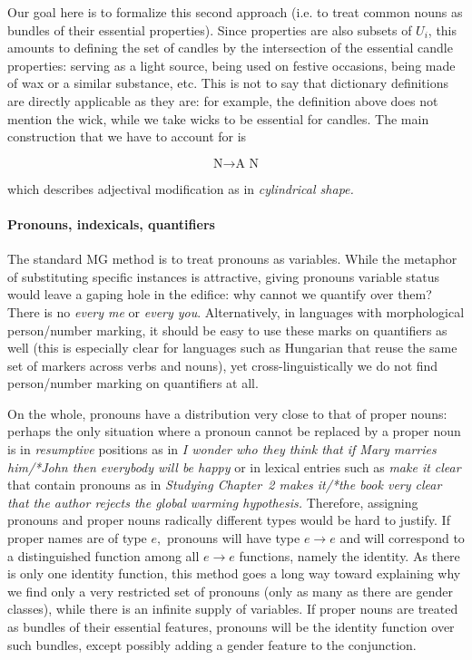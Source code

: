 \smallskip\noindent Our goal here is to formalize this second approach
(i.e. to treat common nouns as bundles of their essential properties).  Since
properties are also subsets of $U_i$, this amounts to defining the set of
candles by the intersection of the essential candle properties: serving as a
light source, being used on festive occasions, being made of wax or a similar
substance, etc. This is not to say that dictionary definitions are directly
applicable as they are: for example, the definition above does not mention the
wick, while we take wicks to be essential for candles.  The main construction
that we have to account for is

\begin{equation}
\text{N} \rightarrow \text{A}  \text{ N}
\end{equation}

\noindent
which describes adjectival modification as in {\it cylindrical shape.}

\paragraph{Pronouns, indexicals, quantifiers}

The standard MG method is to treat pronouns as variables.  While the metaphor
of substituting specific instances is attractive, giving pronouns variable
status would leave a gaping hole in the edifice: why cannot we quantify over
them?  There is no {\it *every me} or {\it *every you}.  Alternatively, in
languages with morphological person/number marking, it should be easy to use
these marks on quantifiers as well (this is especially clear for languages
such as Hungarian that reuse the same set of markers across verbs and nouns),
yet cross-linguistically we do not find person/number marking on quantifiers
at all.

On the whole, pronouns have a distribution very close to that of proper nouns:
perhaps the only situation where a pronoun cannot be replaced by a proper
noun is in {\it resumptive} positions as in {\it I wonder who they think that
  if Mary marries him/*John then everybody will be happy} or in lexical
entries such as {\it make it clear} that contain pronouns as in {\it Studying
  Chapter~2 makes it/*the book very clear that the author rejects the global
  warming hypothesis.}  Therefore, assigning pronouns and proper nouns
radically different types would be hard to justify. If proper names are of
type $e,$ pronouns will have type $e \rightarrow e$ and will correspond to a
distinguished function among all $e \rightarrow e$ functions, namely the
identity. As there is only one identity function, this method goes a long way
toward explaining why we find only a very restricted set of pronouns (only as
many as there are gender classes), while there is an infinite supply of
variables.   If proper nouns are treated as bundles
of their essential features, pronouns will be the identity function over such
bundles, except possibly adding a gender feature to the conjunction.

